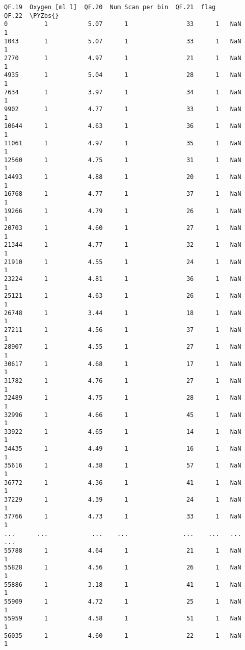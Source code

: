 \documentclass[a4paper,11pt,final]{article}
\def\PYZbs{\char`\\}
\begin{document}
\begin{Verbatim}[commandchars=\\\{\},frame=leftline,fontsize=\small, xleftmargin=0.5em]
       QF.19  Oxygen [ml l]  QF.20  Num Scan per bin  QF.21  flag
QF.22  \PYZbs{}
0          1           5.07      1                33      1   NaN
1
1043       1           5.07      1                33      1   NaN
1
2770       1           4.97      1                21      1   NaN
1
4935       1           5.04      1                28      1   NaN
1
7634       1           3.97      1                34      1   NaN
1
9902       1           4.77      1                33      1   NaN
1
10644      1           4.63      1                36      1   NaN
1
11061      1           4.97      1                35      1   NaN
1
12560      1           4.75      1                31      1   NaN
1
14493      1           4.88      1                20      1   NaN
1
16768      1           4.77      1                37      1   NaN
1
19266      1           4.79      1                26      1   NaN
1
20703      1           4.60      1                27      1   NaN
1
21344      1           4.77      1                32      1   NaN
1
21910      1           4.55      1                24      1   NaN
1
23224      1           4.81      1                36      1   NaN
1
25121      1           4.63      1                26      1   NaN
1
26748      1           3.44      1                18      1   NaN
1
27211      1           4.56      1                37      1   NaN
1
28907      1           4.55      1                27      1   NaN
1
30617      1           4.68      1                17      1   NaN
1
31782      1           4.76      1                27      1   NaN
1
32489      1           4.75      1                28      1   NaN
1
32996      1           4.66      1                45      1   NaN
1
33922      1           4.65      1                14      1   NaN
1
34435      1           4.49      1                16      1   NaN
1
35616      1           4.38      1                57      1   NaN
1
36772      1           4.36      1                41      1   NaN
1
37229      1           4.39      1                24      1   NaN
1
37766      1           4.73      1                33      1   NaN
1
...      ...            ...    ...               ...    ...   ...
...
55788      1           4.64      1                21      1   NaN
1
55828      1           4.56      1                26      1   NaN
1
55886      1           3.18      1                41      1   NaN
1
55909      1           4.72      1                25      1   NaN
1
55959      1           4.58      1                51      1   NaN
1
56035      1           4.60      1                22      1   NaN
1

\end{Verbatim}
\end{document}
